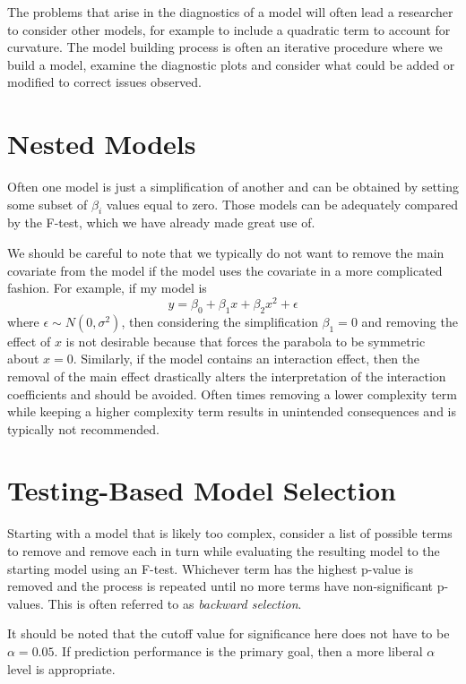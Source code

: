 \documentclass[]{book}
\theoremstyle{definition}
\theoremstyle{definition}
\theoremstyle{remark}
\begin{document}
The problems that arise in the diagnostics of a model will often lead a
researcher to consider other models, for example to include a quadratic
term to account for curvature. The model building process is often an
iterative procedure where we build a model, examine the diagnostic plots
and consider what could be added or modified to correct issues observed.

\section{Nested Models}\label{nested-models}

Often one model is just a simplification of another and can be obtained
by setting some subset of \(\beta_{i}\) values equal to zero. Those
models can be adequately compared by the F-test, which we have already
made great use of.

We should be careful to note that we typically do not want to remove the
main covariate from the model if the model uses the covariate in a more
complicated fashion. For example, if my model is
\[y=\beta_{0}+\beta_{1}x+\beta_{2}x^{2}+\epsilon\] where
\(\epsilon\sim N\left(0,\sigma^{2}\right)\), then considering the
simplification \(\beta_{1}=0\) and removing the effect of \(x\) is not
desirable because that forces the parabola to be symmetric about
\(x=0\). Similarly, if the model contains an interaction effect, then
the removal of the main effect drastically alters the interpretation of
the interaction coefficients and should be avoided. Often times removing
a lower complexity term while keeping a higher complexity term results
in unintended consequences and is typically not recommended.

\section{Testing-Based Model
Selection}\label{testing-based-model-selection}

Starting with a model that is likely too complex, consider a list of
possible terms to remove and remove each in turn while evaluating the
resulting model to the starting model using an F-test. Whichever term
has the highest p-value is removed and the process is repeated until no
more terms have non-significant p-values. This is often referred to as
\emph{backward selection}.

It should be noted that the cutoff value for significance here does not
have to be \(\alpha=0.05\). If prediction performance is the primary
goal, then a more liberal \(\alpha\) level is appropriate.
\end{document}
